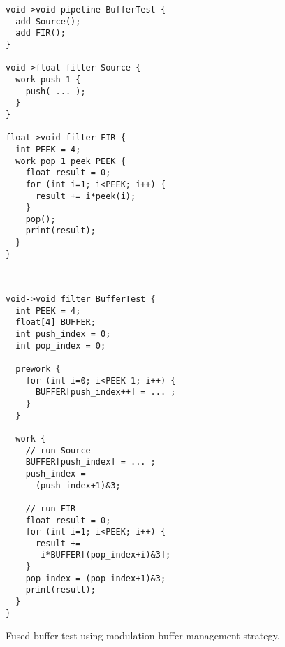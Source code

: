 \begin{figure}[t]
\nocaptionrule

\begin{minipage}{1.5in}
\centering
{\FusionFigA
\begin{verbatim}
void->void pipeline BufferTest {
  add Source();                 
  add FIR();                    
}                               
                                
void->float filter Source {     
  work push 1 {                 
    push( ... );             
  } 
}                               
                                
float->void filter FIR {        
  int PEEK = 4;                 
  work pop 1 peek PEEK {        
    float result = 0;           
    for (int i=1; i<PEEK; i++) {
      result += i*peek(i);      
    }                           
    pop();                      
    print(result);              
  }                             
}                               
\end{verbatim}}
\vspace{-6pt}

\caption{Original StreamIt code for the buffer test.\protect\label{fig:code-orig}}
\end{minipage}
~~\vrule~
\begin{minipage}{1.5in}
{\FusionFigA
\begin{verbatim}
void->void filter BufferTest {       
  int PEEK = 4;                      
  float[4] BUFFER;                   
  int push_index = 0;                
  int pop_index = 0;                 
                                     
  prework {                          
    for (int i=0; i<PEEK-1; i++) {   
      BUFFER[push_index++] = ... ;
    }                                
  }                                  
                                     
  work {                             
    // run Source                    
    BUFFER[push_index] = ... ;
    push_index =                     
      (push_index+1)&3;              
                                     
    // run FIR                       
    float result = 0;                
    for (int i=1; i<PEEK; i++) {     
      result +=                      
       i*BUFFER[(pop_index+i)&3];    
    }                                
    pop_index = (pop_index+1)&3;     
    print(result);                   
  }                                  
}                                    
\end{verbatim}}
\vspace{-6pt}

\caption{Fused buffer test using modulation buffer management strategy.\protect\label{fig:code-modulation}}
\end{minipage}
\vspace{-12pt}
\end{figure}
